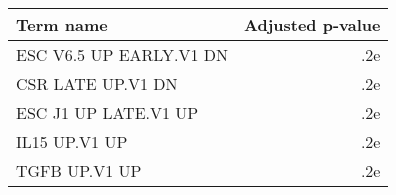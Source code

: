 \begin{tabular}{lr}
\toprule
              Term name &  Adjusted p-value \\
\midrule
ESC V6.5 UP EARLY.V1 DN &               .2e \\
      CSR LATE UP.V1 DN &               .2e \\
   ESC J1 UP LATE.V1 UP &               .2e \\
          IL15 UP.V1 UP &               .2e \\
          TGFB UP.V1 UP &               .2e \\
\bottomrule
\end{tabular}
